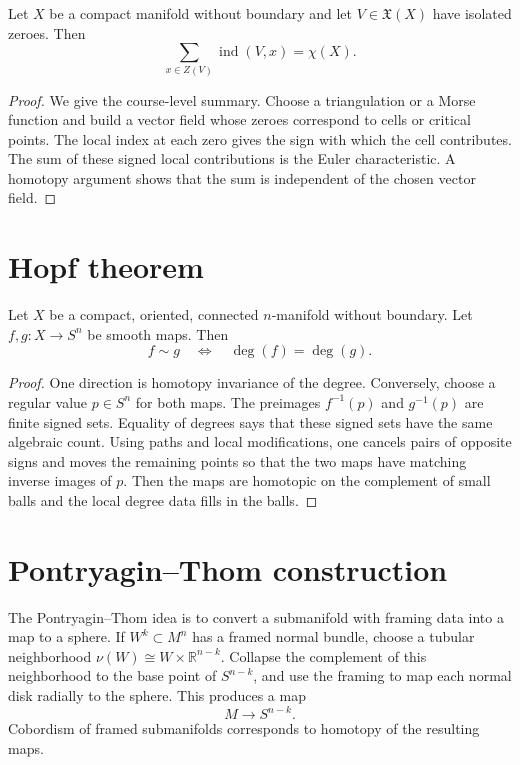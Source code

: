 \begin{theorem}
\label{theorem-Poincare-Hopf}
Let $X$ be a compact manifold without
boundary and let $V\in\mathfrak X(X)$ have
isolated zeroes.  Then
$$
\sum_{x\in Z(V)}\operatorname{ind}(V,x)
=\chi(X).
$$
\end{theorem}

\begin{proof}
We give the course-level summary.  Choose a
triangulation or a Morse function and build a
vector field whose zeroes correspond to cells
or critical points.  The local index at each
zero gives the sign with which the cell
contributes.  The sum of these signed local
contributions is the Euler characteristic.
A homotopy argument shows that the sum is
independent of the chosen vector field.
\end{proof}

\section{Hopf theorem}
\label{section-Hopf-theorem}

\begin{theorem}[Hopf]
\label{theorem-Hopf}
Let $X$ be a compact, oriented, connected
$n$-manifold without boundary.  Let
$f,g:X\to S^n$ be smooth maps.  Then
$$
f\sim g
\quad\Longleftrightarrow\quad
\deg(f)=\deg(g).
$$
\end{theorem}

\begin{proof}
One direction is homotopy invariance of the
degree.  Conversely, choose a regular value
$p\in S^n$ for both maps.  The preimages
$f^{-1}(p)$ and $g^{-1}(p)$ are finite signed
sets.  Equality of degrees says that these
signed sets have the same algebraic count.
Using paths and local modifications, one
cancels pairs of opposite signs and moves the
remaining points so that the two maps have
matching inverse images of $p$.  Then the
maps are homotopic on the complement of small
balls and the local degree data fills in the
balls.
\end{proof}

\section{Pontryagin--Thom construction}
\label{section-pontryagin-thom}

\noindent
The Pontryagin--Thom idea is to convert a
submanifold with framing data into a map to a
sphere.  If $W^k\subset M^n$ has a framed
normal bundle, choose a tubular neighborhood
$\nu(W)\cong W\times\mathbb R^{n-k}$.  Collapse
the complement of this neighborhood to the
base point of $S^{n-k}$, and use the framing
to map each normal disk radially to the
sphere.  This produces a map
$$
M\to S^{n-k}.
$$
Cobordism of framed submanifolds corresponds
to homotopy of the resulting maps.

